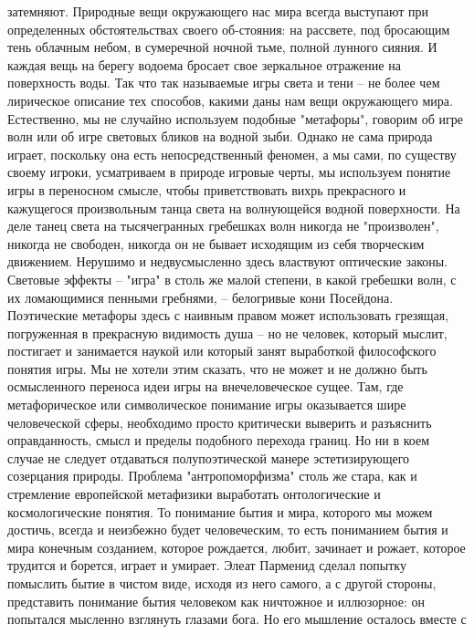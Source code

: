 \documentclass[12pt]{article}
\begin{document}
затемняют. Природные  вещи  окружающего нас мира  всегда выступают при  определенных обстоятельствах
своего об-стояния: на рассвете, под бросающим тень облачным небом, в сумеречной ночной тьме, полной
лунного сияния. И каждая вещь на берегу водоема бросает свое зеркальное отражение на поверхность воды. Так
что так называемые игры света и тени -- не более чем лирическое описание тех способов, какими даны нам
вещи окружающего мира. Естественно, мы не случайно используем подобные "метафоры", говорим об игре
волн  или  об  игре  световых  бликов  на  водной  зыби.  Однако  не  сама  природа  играет,  поскольку  она  есть
непосредственный феномен, а мы сами, по существу своему игроки, усматриваем в природе игровые черты, мы
используем  понятие  игры  в  переносном  смысле,  чтобы  приветствовать  вихрь  прекрасного  и  кажущегося
произвольным  танца  света  на  волнующейся  водной  поверхности.  На  деле  танец  света  на  тысячегранных
гребешках  волн  никогда  не  "произволен",  никогда  не  свободен,  никогда  он  не  бывает  исходящим  из  себя
творческим движением. Нерушимо и недвусмысленно здесь властвуют оптические законы. Световые эффекты
--  "игра"  в  столь  же  малой  степени,  в  какой  гребешки  волн,  с  их  ломающимися  пенными  гребнями,  --  
белогривые кони Посейдона. Поэтические метафоры здесь с наивным правом может использовать грезящая,
погруженная в прекрасную видимость душа -- но не человек, который мыслит, постигает и занимается наукой
или который занят выработкой философского понятия игры. Мы не хотели этим сказать, что не может и не
должно  быть  осмысленного  переноса  идеи  игры  на  внечеловеческое  сущее.  Там,  где  метафорическое  или
символическое  понимание  игры  оказывается  шире  человеческой  сферы,  необходимо  просто  критически
выверить и разъяснить оправданность, смысл и пределы подобного перехода границ. Но ни в коем случае не
следует  отдаваться  полупоэтической  манере  эстетизирующего  созерцания  природы.  Проблема
"антропоморфизма" столь же стара, как и стремление европейской метафизики выработать онтологические и
космологические понятия. То понимание бытия и мира, которого мы можем достичь, всегда и неизбежно будет
человеческим, то есть пониманием бытия и мира конечным созданием, которое рождается, любит, зачинает и
рожает, которое трудится и борется, играет и умирает. Элеат Парменид сделал попытку помыслить бытие в
чистом  виде,  исходя  из  него  самого,  а  с  другой  стороны,  представить  понимание  бытия  человеком  как
ничтожное и иллюзорное: он попытался мысленно взглянуть глазами бога. Но его мышление осталось вместе с
\end{document}
